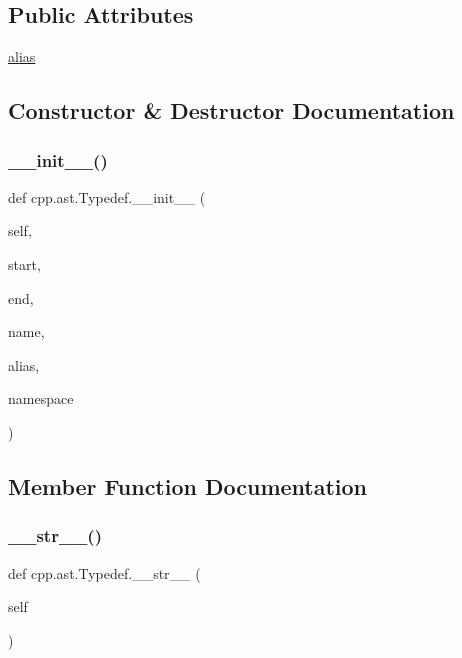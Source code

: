 \subsection*{Public Attributes}
\begin{DoxyCompactItemize}
\item 
\mbox{\hyperlink{classcpp_1_1ast_1_1_typedef_a3187a504dfbefe50b866b44902823c30}{alias}}
\end{DoxyCompactItemize}


\subsection{Constructor \& Destructor Documentation}
\mbox{\label{classcpp_1_1ast_1_1_typedef_af3275d2390190a074de470c1424e05e0}} 
\subsubsection{\texorpdfstring{\_\_init\_\_()}{\_\_init\_\_()}}
{\footnotesize\ttfamily def cpp.\+ast.\+Typedef.\+\_\+\+\_\+init\+\_\+\+\_\+ (\begin{DoxyParamCaption}\item[{}]{self,  }\item[{}]{start,  }\item[{}]{end,  }\item[{}]{name,  }\item[{}]{alias,  }\item[{}]{namespace }\end{DoxyParamCaption})}



\subsection{Member Function Documentation}
\mbox{\label{classcpp_1_1ast_1_1_typedef_a451920900affc5f12e38ab8fbf5e3dea}} 
\subsubsection{\texorpdfstring{\_\_str\_\_()}{\_\_str\_\_()}}
{\footnotesize\ttfamily def cpp.\+ast.\+Typedef.\+\_\+\+\_\+str\+\_\+\+\_\+ (\begin{DoxyParamCaption}\item[{}]{self }\end{DoxyParamCaption})}

